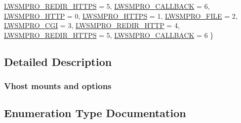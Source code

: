 \begin{DoxyCompactItemize}
\hyperlink{group__vhost-mounts_gga31eca18e50cb4357480f2fcad36ff437a8894d16316863077dfe530963ca59f67}{L\+W\+S\+M\+P\+R\+O\+\_\+\+R\+E\+D\+I\+R\+\_\+\+H\+T\+T\+PS} = 5, 
\newline
\hyperlink{group__vhost-mounts_gga31eca18e50cb4357480f2fcad36ff437a946a88cf9c852eed2c0317f4115d19da}{L\+W\+S\+M\+P\+R\+O\+\_\+\+C\+A\+L\+L\+B\+A\+CK} = 6, 
\hyperlink{group__vhost-mounts_gga31eca18e50cb4357480f2fcad36ff437a1e9f0842b0e85db50fe648ed4ba9a4b0}{L\+W\+S\+M\+P\+R\+O\+\_\+\+H\+T\+TP} = 0, 
\hyperlink{group__vhost-mounts_gga31eca18e50cb4357480f2fcad36ff437afbd10eb4777517ed1f6bfdcf3b9ea1d1}{L\+W\+S\+M\+P\+R\+O\+\_\+\+H\+T\+T\+PS} = 1, 
\hyperlink{group__vhost-mounts_gga31eca18e50cb4357480f2fcad36ff437a42f2361cfe76cd287fa8fcfc502357e2}{L\+W\+S\+M\+P\+R\+O\+\_\+\+F\+I\+LE} = 2, 
\newline
\hyperlink{group__vhost-mounts_gga31eca18e50cb4357480f2fcad36ff437a13ab58b01ac6e05f595977f1e0f0db69}{L\+W\+S\+M\+P\+R\+O\+\_\+\+C\+GI} = 3, 
\hyperlink{group__vhost-mounts_gga31eca18e50cb4357480f2fcad36ff437aec137a2434851bd856ceebfb697b9970}{L\+W\+S\+M\+P\+R\+O\+\_\+\+R\+E\+D\+I\+R\+\_\+\+H\+T\+TP} = 4, 
\hyperlink{group__vhost-mounts_gga31eca18e50cb4357480f2fcad36ff437a8894d16316863077dfe530963ca59f67}{L\+W\+S\+M\+P\+R\+O\+\_\+\+R\+E\+D\+I\+R\+\_\+\+H\+T\+T\+PS} = 5, 
\hyperlink{group__vhost-mounts_gga31eca18e50cb4357480f2fcad36ff437a946a88cf9c852eed2c0317f4115d19da}{L\+W\+S\+M\+P\+R\+O\+\_\+\+C\+A\+L\+L\+B\+A\+CK} = 6
 \}
\end{DoxyCompactItemize}


\subsection{Detailed Description}
\subsubsection*{Vhost mounts and options}

\subsection{Enumeration Type Documentation}
\mbox{\label{group__vhost-mounts_ga31eca18e50cb4357480f2fcad36ff437}} 
